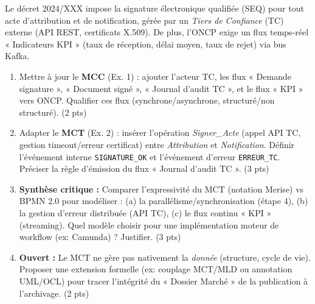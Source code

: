 \documentclass[11pt]{article}
\begin{document}
\begin{exercice}
Le décret 2024/XXX impose la signature électronique qualifiée (SEQ) pour tout acte d'attribution et de notification, gérée par un \textit{Tiers de Confiance} (TC) externe (API REST, certificats X.509). De plus, l'ONCP exige un flux temps-réel « Indicateurs KPI » (taux de réception, délai moyen, taux de rejet) via bus Kafka.
\begin{enumerate}
    \item Mettre à jour le \textbf{MCC} (Ex. 1) : ajouter l'acteur TC, les flux « Demande signature », « Document signé », « Journal d'audit TC », et le flux « KPI » vers ONCP. Qualifier ces flux (synchrone/asynchrone, structuré/non structuré). (2 pts)
    \item Adapter le \textbf{MCT} (Ex. 2) : insérer l'opération \textit{Signer\_Acte} (appel API TC, gestion timeout/erreur certificat) entre \textit{Attribution} et \textit{Notification}. Définir l'événement interne \texttt{SIGNATURE\_OK} et l'événement d'erreur \texttt{ERREUR\_TC}. Préciser la règle d'émission du flux « Journal d'audit TC ». (3 pts)
    \item \textbf{Synthèse critique :} Comparer l'expressivité du MCT (notation Merise) vs BPMN 2.0 pour modéliser : (a) la parallélisme/synchronisation (étape 4), (b) la gestion d'erreur distribuée (API TC), (c) le flux continu « KPI » (streaming). Quel modèle choisir pour une implémentation moteur de workflow (ex: Camunda) ? Justifier. (3 pts)
    \item \textbf{Ouvert :} Le MCT ne gère pas nativement la \textit{donnée} (structure, cycle de vie). Proposer une extension formelle (ex: couplage MCT/MLD ou annotation UML/OCL) pour tracer l'intégrité du « Dossier Marché » de la publication à l'archivage. (2 pts)
\end{enumerate}
\end{exercice}
\end{document}
